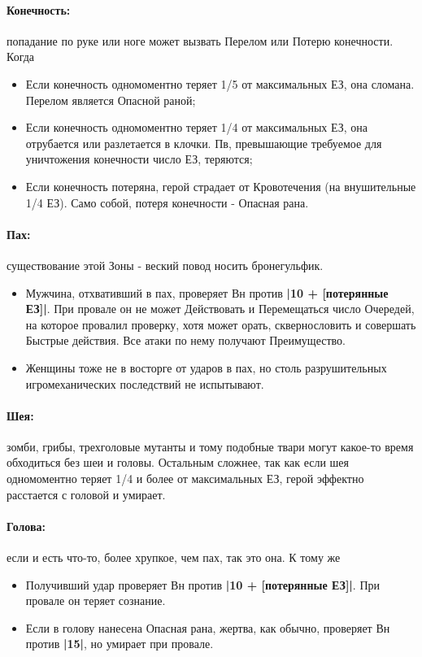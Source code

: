 \paragraph{Конечность:} попадание по руке или ноге может вызвать Перелом или Потерю конечности. Когда
\begin{itemize}
  \item Если конечность одномоментно теряет 1/5 от максимальных ЕЗ, она сломана. Перелом является Опасной раной;
  \item Если конечность одномоментно теряет  1/4 от максимальных ЕЗ, она отрубается или разлетается в клочки. Пв, превышающие требуемое для уничтожения конечности число ЕЗ, теряются;
  \item Если конечность потеряна, герой страдает от Кровотечения (на внушительные 1/4 ЕЗ). Само собой, потеря конечности - Опасная рана.
\end{itemize}
\paragraph{Пах:} существование этой Зоны - веский повод носить бронегульфик.
\begin{itemize}
  \item Мужчина, отхвативший в пах, проверяет Вн против \textbf{|10 + [потерянные ЕЗ]|}. При провале он не может Действовать и Перемещаться число Очередей, на которое провалил проверку, хотя может орать, сквернословить и совершать Быстрые действия. Все атаки по нему получают Преимущество.
  \item Женщины тоже не в восторге от ударов в пах, но столь разрушительных игромеханических последствий не испытывают. 
\end{itemize}
\paragraph{Шея:} зомби, грибы, трехголовые мутанты и тому подобные твари могут какое-то время обходиться без шеи и головы.
\newline Остальным сложнее, так как если шея одномоментно теряет 1/4 и более от максимальных ЕЗ, герой эффектно расстается с головой и умирает.
\paragraph{Голова:} если и есть что-то, более хрупкое, чем пах, так это она. К тому же
\begin{itemize}
  \item Получивший удар проверяет Вн против \textbf{|10 + [потерянные ЕЗ]|}. При провале он теряет сознание.
  \item Если в голову нанесена Опасная рана, жертва, как обычно, проверяет Вн против \textbf{|15|}, но умирает при провале.
\end{itemize}
